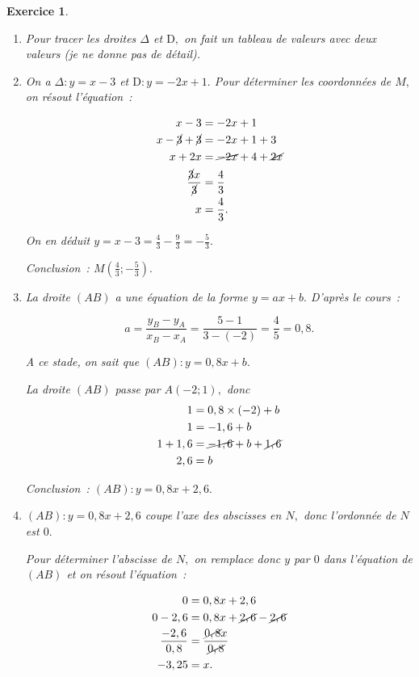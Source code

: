 \documentclass[10pt]{article}
\newtheorem{exo}{Exercice}
\begin{document}
\begin{exo}


\begin{enumerate}
\item Pour tracer les droites $\Delta$ et $\mathrm{D},$ on fait un tableau de valeurs avec deux valeurs (je ne donne pas de détail).
\item On a $\Delta:y=x-3$ et $\mathrm{D}:y=-2x+1.$ Pour déterminer les coordonnées de $M,$ on résout l'équation~:

\begin{align*}
x-3&=-2x+1\\
x-\cancel{3}+\cancel{3}&=-2x+1+3\\
x+2x&=\cancel{-2x}+4+\cancel{2x}\\
\frac{\cancel{3}x}{\cancel{3}}&=\frac{4}{3}\\
x&=\frac{4}{3}.
\end{align*}

On en déduit $y=x-3=\frac{4}{3}-\frac{9}{3}=-\frac{5}{3}.$

Conclusion~: $M\left(\frac{4}{3};-\frac{5}{3}\right).$
\item La droite $(AB)$ a une équation de la forme $y=ax+b.$ D'après le cours~:

\[a=\frac{y_B-y_A}{x_B-x_A}=\frac{5-1}{3-(-2)}=\frac{4}{5}=0,8.\]

A ce stade, on sait que $(AB):y=0,8x+b.$

\medskip

La droite $(AB)$ passe par $A(-2;1),$ donc
\begin{align*}1&=0,8\times (-2)+b\\
1&=-1,6+b\\
1+1,6&=\cancel{-1,6}+b+\cancel{1,6}\\
2,6&=b
\end{align*}


Conclusion~: $(AB):y=0,8x+2,6.$

\item $(AB):y=0,8x+2,6$ coupe l'axe des abscisses en $N,$ donc l'ordonnée de $N$ est $0.$

Pour déterminer l'abscisse de $N,$ on remplace donc $y$ par $0$ dans l'équation de $(AB)$ et on résout l'équation~:

\begin{align*}
0&=0,8x+2,6\\
0-2,6&=0,8x+\cancel{2,6}-\cancel{2,6}\\
\frac{-2,6}{0,8}&=\frac{\cancel{0,8}x}{\cancel{0,8}}\\
-3,25&=x.\end{align*}


\end{enumerate}
\end{exo}
\end{document}
